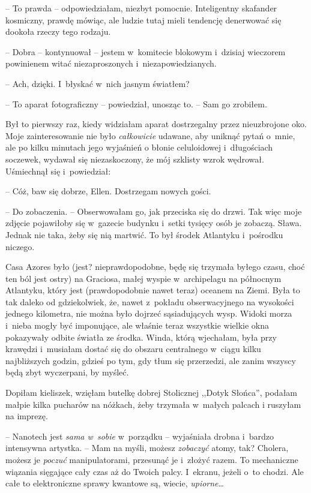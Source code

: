 \documentclass[oneside,polish,11pt,sfheadings]{mwbk}
\begin{document}
-- To prawda -- odpowiedziałam, niezbyt pomocnie. Inteligentny skafander
kosmiczny, prawdę mówiąc, ale ludzie tutaj mieli tendencję denerwować
się dookoła rzeczy tego rodzaju.

-- Dobra -- kontynuował -- jestem w~komitecie blokowym i~dzisiaj wieczorem
powinienem witać niezaproszonych i~niezapowiedzianych.

-- Ach, dzięki. I~błyskać w~nich jasnym światłem?

-- To aparat fotograficzny -- powiedział, unosząc to. -- Sam go zrobiłem.

Był to pierwszy raz, kiedy widziałam aparat dostrzegalny przez
nieuzbrojone oko. Moje zainteresowanie nie było \textit{całkowicie}
udawane, aby uniknąć pytań o~mnie, ale po kilku minutach jego wyjaśnień
o błonie celuloidowej i~długościach soczewek, wydawał się niezaskoczony,
że mój szklisty wzrok wędrował. Uśmiechnął się i~powiedział:

-- Cóż, baw się dobrze, Ellen. Dostrzegam nowych gości.

-- Do zobaczenia. -- Obserwowałam go, jak przeciska się do drzwi. Tak więc
moje zdjęcie pojawiłoby się w~gazecie budynku i~setki tysięcy osób je
zobaczą. Sława. Jednak nie taka, żeby się nią martwić. To był środek
Atlantyku i~pośrodku niczego.

Casa Azores było (jest? nieprawdopodobne, będę się trzymała byłego
czasu, choć ten ból jest ostry) na Graciosa, małej wyspie w~archipelagu
na północnym Atlantyku, który jest (prawdopodobnie nawet teraz) oceanem
na Ziemi. Była to tak daleko od gdziekolwiek, że, nawet z~pokładu
obserwacyjnego na wysokości jednego kilometra, nie można było dojrzeć
sąsiadujących wysp. Widoki morza i~nieba mogły być imponujące, ale
właśnie teraz wszystkie wielkie okna pokazywały odbite światła ze
środka. Winda, którą wjechałam, była przy krawędzi i~musiałam dostać się
do obszaru centralnego w~ciągu kilku najbliższych godzin, gdzieś po tym,
gdy tłum się przerzedzi, ale zanim wszyscy będą zbyt wyczerpani, by
myśleć.

Dopiłam kieliszek, wzięłam butelkę dobrej Stolicznej ,,Dotyk Słońca'',
podałam małpie kilka pucharów na nóżkach, żeby trzymała w~małych palcach
i ruszyłam na imprezę.

-- Nanotech jest \textit{sama w~sobie} w~porządku -- wyjaśniała drobna i~bardzo intensywna artystka. -- Mam na myśli, możesz \textit{zobaczyć}
atomy, tak? Cholera, możesz je \textit{poczuć} manipulatorami, przesunąć
je i~złożyć razem. To mechaniczne wiązania sięgające cały czas aż do
Twoich palcy. I~ekranu, jeżeli o~to chodzi. Ale całe to elektroniczne
sprawy kwantowe są, wiecie, \textit{upiorne}\ldots 
\end{document}
